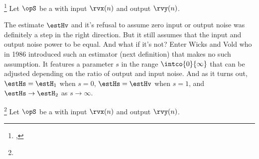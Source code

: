\begin{definition}
\footnote{
  ,
  }
\label{def:Hv}
Let $\opS$ be a  with input $\rvx(n)$ and output $\rvy(n)$.
\end{definition}

The estimate $\estHv$ and it's refusal to assume zero input or output noise
was definitely a step in the right direction.
But it still assumes that the input and output noise power to be equal.
And what if it's not?
Enter Wicks and Vold who in 1986 introduced such an estimator (next definition)
that makes no such assumption.
It features a parameter $s$ in the range $\intco{0}{\infty}$
that can be adjusted depending on the ratio of output and input noise.
And as it turns out, $\estHs = \estH_1$ when $s=0$, $\estHs=\estHv$ when $s=1$, and
$\estHs\to\estH_2$ as $s\to\infty$. %
\begin{definition}
\footnote{
  }
\label{def:Hs}
Let $\opS$ be a  with input $\rvx(n)$ and output $\rvy(n)$.
\end{definition}


